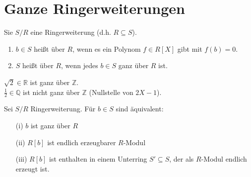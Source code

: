 \section{Ganze Ringerweiterungen}

\begin{Def} 
  Sie $S/R$ eine Ringerweiterung (d.h. $R \subseteq S$).
  \begin{enumerate} 
    \item $b \in S$ heißt  über $R$, wenn es ein 
          Polynom $f \in R[X]$ gibt mit $f(b) = 0$.
    \item $S$ heißt  über $R$, wenn jedes
    $b \in S$ ganz über $R$ ist.
\end{enumerate}
\end{Def}

\begin{nnBsp} 
  $\sqrt{2} \in \mathbb{R}$ ist ganz über $\mathbb{Z}$.\\
  $\frac{1}{2} \in \mathbb{Q}$ ist nicht ganz über $\mathbb{Z}$ (Nullstelle von
  $2X -1$).
\end{nnBsp}

\begin{Prop}
\label{2.7}
  Sei $S/R$ Ringerweiterung. Für $b \in S$ sind äquivalent:
  \begin{enumerate} 
    \item[(i)] $b$ ist ganz über $R$
    \item[(ii)] $R[b]$ ist endlich erzeugbarer $R$-Modul
    \item[(iii)] $R[b]$ ist enthalten in einem Unterring $S' \subseteq S$, der
                 als $R$-Modul endlich erzeugt ist.
\end{enumerate}
\end{Prop}

